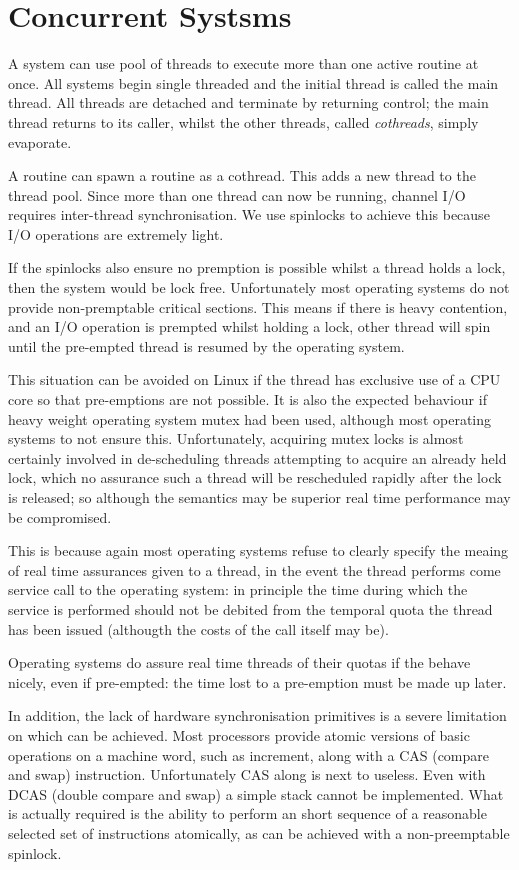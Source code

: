 \documentclass[oneside]{book}
\begin{document}
\section{Concurrent Systsms}
A system can use pool of threads to execute more than one active
routine at once. All systems begin single threaded and the initial
thread is called the main thread. All threads are detached and terminate
by returning control; the main thread returns to its caller, whilst
the other threads, called {\em cothreads}, simply evaporate.

A routine can spawn a routine as a cothread. This adds a new thread
to the thread pool. Since more than one thread can now be running,
channel I/O requires inter-thread synchronisation. We use spinlocks
to achieve this because I/O operations are extremely light.

If the spinlocks also ensure no premption is possible whilst a thread
holds a lock, then the system would be lock free. Unfortunately most
operating systems do not provide non-premptable critical sections.
This means if there is heavy contention, and an I/O operation is prempted
whilst holding a lock, other thread will spin until the pre-empted thread
is resumed by the operating system.

This situation can be avoided on Linux if the thread has exclusive use
of a CPU core so that pre-emptions are not possible. It is also the
expected behaviour if heavy weight operating system mutex had been used,
although most operating systems to not ensure this. Unfortunately,
acquiring mutex locks is almost certainly involved in de-scheduling
threads attempting to acquire an already held lock, which no assurance
such a thread will be rescheduled rapidly after the lock is released;
so although the semantics may be superior real time performance
may be compromised.

This is because again most operating systems refuse to clearly specify
the meaing of real time assurances given to a thread, in the event
the thread performs come service call to the operating system: in principle
the time during which the service is performed should not be debited
from the temporal quota the thread has been issued (althougth the costs of
the call itself may be).

Operating systems do assure real time threads of their quotas if the
behave nicely, even if pre-empted: the time lost to a pre-emption
must be made up later. 

In addition, the lack of hardware synchronisation primitives is a severe
limitation on which can be achieved. Most processors provide atomic
versions of basic operations on a machine word, such as increment,
along with a CAS (compare and swap) instruction. Unfortunately CAS
along is next to useless. Even with DCAS (double compare and swap)
a simple stack cannot be implemented. What is actually required
is the ability to perform an short sequence of a reasonable selected
set of instructions atomically, as can be achieved with a non-preemptable
spinlock. 
\end{document}
